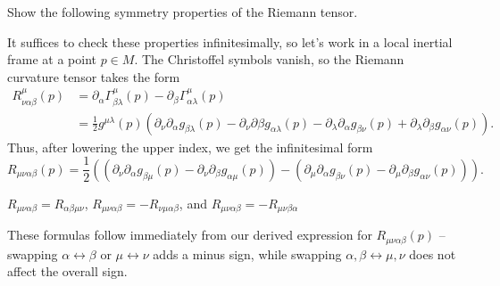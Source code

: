 \documentclass{../../templates/lkx_pset}
\begin{document}
\begin{problem}{7}
Show the following symmetry properties of the Riemann tensor.
\end{problem}
\begin{solution}
	It suffices to check these properties infinitesimally, so let's work in a local inertial frame at a point $p\in M$. The Christoffel symbols vanish, so the Riemann curvature tensor takes the form
	\[
		\begin{aligned}
			R^{\mu}_{\nu\alpha\beta}(p)
			 & = \partial_\alpha \Gamma^\mu_{\beta\lambda}(p) - \partial_\beta \Gamma^\mu_{\alpha\lambda}(p)                                                                                                                                                      \\
			 & = \frac{1}{2}g^{\mu\lambda}(p)\left( \partial_\nu \partial_\alpha g_{\beta\lambda}(p) - \partial_\nu\partial\beta g_{\alpha\lambda}(p) - \partial_\lambda\partial_\alpha g_{\beta\nu}(p) + \partial_\lambda\partial_\beta g_{\alpha\nu}(p)\right).
		\end{aligned}
	\]
	Thus, after lowering the upper index, we get the infinitesimal form
	\[
		R_{\mu\nu\alpha\beta}(p) =
		\frac{1}{2}\left((\partial_\nu\partial_\alpha g_{\beta\mu}(p) -\partial_\nu\partial_\beta g_{\alpha\mu}(p)) - (\partial_\mu\partial_\alpha g_{\beta\nu}(p) - \partial_\mu\partial_\beta g_{\alpha\nu}(p))\right).
	\]


	\begin{part}{}
		$R_{\mu\nu\alpha\beta} = R_{\alpha\beta\mu\nu}$,
		$R_{\mu\nu\alpha\beta} = -R_{\nu\mu\alpha\beta}$, and
		$R_{\mu\nu\alpha\beta}=-R_{\mu\nu\beta\alpha}$
	\end{part}

	These formulas follow immediately from our derived expression for $R_{\mu\nu\alpha\beta}(p)$ -- swapping $\alpha\leftrightarrow \beta$ or $\mu\leftrightarrow\nu$ adds a minus sign, while swapping $\alpha,\beta \leftrightarrow \mu,\nu$ does not affect the overall sign.


\end{solution}
\end{document}
